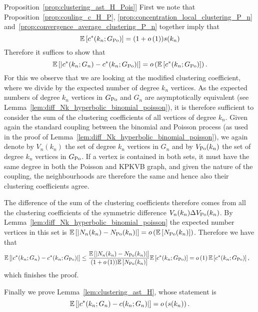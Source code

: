 \begin{proofof}{Proposition~\ref{prop:clustering_ast_H_Pois}]}
First we note that Proposition~\ref{prop:couling_c_H_P}, \ref{prop:concentration_local_clustering_P_n} and~\ref{prop:convergence_average_clustering_P_n} together imply that
\[
	\mathbb{E}\left[c^\ast(k_n; G_{{\mathrm{Po}}})\right] = (1+o\left(1\right))s(k_n)
\]
Therefore it suffices to show that
\[
	\mathbb{E}\left[\left|c^\ast(k_n; G_n) - c^\ast(k_n; G_{{\mathrm{Po}}})\right|\right] = o\left(\mathbb{E}\left[c^\ast(k_n; G_{{\mathrm{Po}}})\right]\right).
\]
For this we observe that we are looking at the modified clustering coefficient, where we divide by the expected number of degree $k_n$ vertices. As the expected numbers of degree $k_n$ vertices in $G_{{\mathrm{Po}}}$ and $G_n$ are asymptotically equivalent (see Lemma~\ref{lem:diff_Nk_hyperbolic_binomial_poisson}), it is therefore sufficient to consider the sum of the clustering coefficients of all vertices of degree $k_n$.
Given again the standard coupling between the binomial and Poisson process (as used in the proof of Lemma~\ref{lem:diff_Nk_hyperbolic_binomial_poisson}), we again denote by $V_n(k_n)$ the set of degree $k_n$ vertices in $G_n$ and by $V_{{\mathrm{Po}}}(k_n)$ the set of degree $k_n$ vertices in $G_{{\mathrm{Po}}}$. If a vertex is contained in both sets, it must have the same degree in both the Poisson and KPKVB graph, and given the nature of the coupling, the neighbourhoods are therefore the same and hence also their clustering coefficients agree.

The difference of the sum of the clustering coefficients therefore comes from all the clustering coefficients of the symmetric difference $V_n(k_n) \Delta V_{{\mathrm{Po}}}(k_n)$. By Lemma~\ref{lem:diff_Nk_hyperbolic_binomial_poisson} the expected number vertices in this set is $\mathbb{E}\left[\left|N_{n}(k_n) - N_{{\mathrm{Po}}}(k_n)\right|\right] = o\left(\mathbb{E}\left[N_{{\mathrm{Po}}}(k_n)\right]\right)$. Therefore we have that
\begin{align*}
	\mathbb{E}\left[\left|c^\ast(k_n; G_n) - c^\ast(k_n; G_{{\mathrm{Po}}})\right|\right]
	&\le \frac{\mathbb{E}\left[\left|N_{n}(k_n)-N_{{\mathrm{Po}}}(k_n)\right|\right]}{(1+o\left(1\right))\mathbb{E}\left[N_{{\mathrm{Po}}}(k_n)\right]} \mathbb{E}\left[c^\ast(k_n; G_{{\mathrm{Po}}})\right]
	= o\left(1\right)\mathbb{E}\left[c^\ast(k_n; G_{{\mathrm{Po}}})\right],
\end{align*}
which finishes the proof.
\end{proofof}

Finally we prove Lemma~\ref{lem:clustering_ast_H}, whose statement is
\[
	\mathbb{E}\left[\left|c^\ast(k_n; G_n) - c(k_n; G_n)\right|\right] = o\left(s(k_n)\right).
\]



